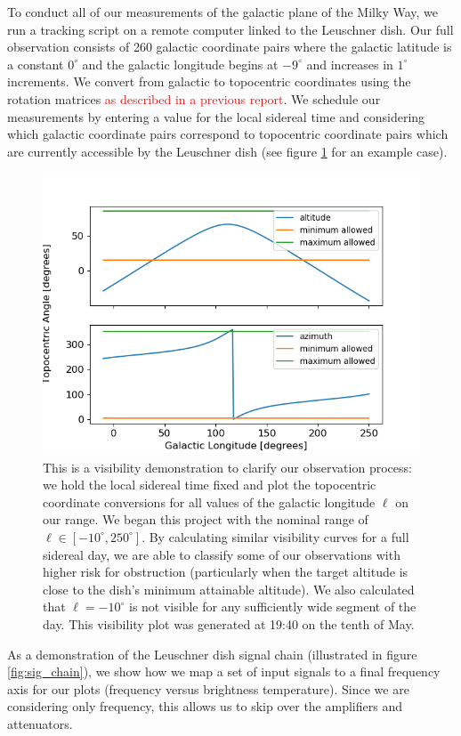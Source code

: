 \documentclass[12pt]{article}
\begin{document}
\quad \quad To conduct all of our measurements of the galactic plane of the Milky Way, we run a tracking script on a remote computer linked to the Leuschner dish. Our full observation consists of 260 galactic coordinate pairs where the galactic latitude is a constant $0^\circ$ and the galactic longitude begins at $-9^\circ$ and increases in $1^\circ$ increments. We convert from galactic to topocentric coordinates using the rotation matrices \textcolor{red}{as described in a previous report}. We schedule our measurements by entering a value for the local sidereal time and considering which galactic coordinate pairs correspond to topocentric coordinate pairs which are currently accessible by the Leuschner dish (see figure \ref{fig:vis_demo} for an example case).

\begin{figure}
	\centering
	\includegraphics[width=.75\linewidth]{1940_10_05_2020}
	\caption{This is a visibility demonstration to clarify our observation process: we hold the local sidereal time fixed and plot the topocentric coordinate conversions for all values of the galactic longitude $\ell$ on our range. We began this project with the nominal range of $\ell \in [-10^\circ, 250^\circ]$. By calculating similar visibility curves for a full sidereal day, we are able to classify some of our observations with higher risk for obstruction (particularly when the target altitude is close to the dish's minimum attainable altitude). We also calculated that $\ell=-10^\circ$ is not visible for any sufficiently wide segment of the day. This visibility plot was generated at 19:40 on the tenth of May.}
	\label{fig:vis_demo}
\end{figure}

As a demonstration of the Leuschner dish signal chain (illustrated in figure \ref{fig:sig_chain}), we show how we map a set of input signals to a final frequency axis for our plots (frequency versus brightness temperature). Since we are considering only frequency, this allows us to skip over the amplifiers and attenuators.
\end{document}
